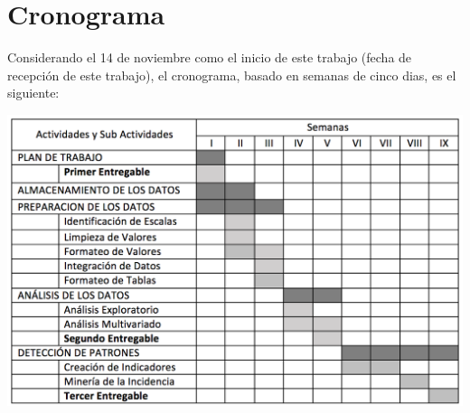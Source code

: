 \documentclass{article}
\begin{document}
\section{Cronograma}

Considerando el 14 de noviembre como el inicio de este trabajo (fecha de recepción de este trabajo), el cronograma, basado en semanas de cinco dias, es el siguiente:

\includegraphics[width=\textwidth]{cronograma}



\end{document}
